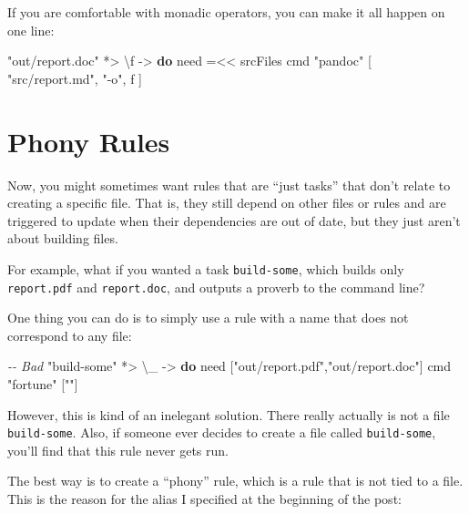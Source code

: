\documentclass[]{article}
\newenvironment{Shaded}{}{}
\newcommand{\CommentTok}[1]{\textcolor[rgb]{0.38,0.63,0.69}{\textit{#1}}}
\newcommand{\KeywordTok}[1]{\textcolor[rgb]{0.00,0.44,0.13}{\textbf{#1}}}
\newcommand{\NormalTok}[1]{#1}
\newcommand{\OperatorTok}[1]{\textcolor[rgb]{0.40,0.40,0.40}{#1}}
\newcommand{\OtherTok}[1]{\textcolor[rgb]{0.00,0.44,0.13}{#1}}
\newcommand{\StringTok}[1]{\textcolor[rgb]{0.25,0.44,0.63}{#1}}
\begin{document}
If you are comfortable with monadic operators, you can make it all happen on one
line:

\begin{Shaded}
\begin{Highlighting}[]
\StringTok{"out/report.doc"} \OperatorTok{*\textgreater{}}\NormalTok{ \textbackslash{}f }\OtherTok{{-}\textgreater{}} \KeywordTok{do}
\NormalTok{    need }\OperatorTok{=\textless{}\textless{}}\NormalTok{ srcFiles}
\NormalTok{    cmd }\StringTok{"pandoc"}\NormalTok{ [ }\StringTok{"src/report.md"}\NormalTok{, }\StringTok{"{-}o"}\NormalTok{, f ]}
\end{Highlighting}
\end{Shaded}

\section{Phony Rules}\label{phony-rules}

Now, you might sometimes want rules that are ``just tasks'' that don't relate to
creating a specific file. That is, they still depend on other files or rules and
are triggered to update when their dependencies are out of date, but they just
aren't about building files.

For example, what if you wanted a task \texttt{build-some}, which builds only
\texttt{report.pdf} and \texttt{report.doc}, and outputs a proverb to the
command line?

One thing you can do is to simply use a rule with a name that does not
correspond to any file:

\begin{Shaded}
\begin{Highlighting}[]
\CommentTok{{-}{-} Bad}
\StringTok{"build{-}some"} \OperatorTok{*\textgreater{}}\NormalTok{ \textbackslash{}\_ }\OtherTok{{-}\textgreater{}} \KeywordTok{do}
\NormalTok{    need [}\StringTok{"out/report.pdf"}\NormalTok{,}\StringTok{"out/report.doc"}\NormalTok{]}
\NormalTok{    cmd }\StringTok{"fortune"}\NormalTok{ [}\StringTok{""}\NormalTok{]}
\end{Highlighting}
\end{Shaded}

However, this is kind of an inelegant solution. There really actually is not a
file \texttt{build-some}. Also, if someone ever decides to create a file called
\texttt{build-some}, you'll find that this rule never gets run.

The best way is to create a ``phony'' rule, which is a rule that is not tied to
a file. This is the reason for the alias I specified at the beginning of the
post:
\end{document}

